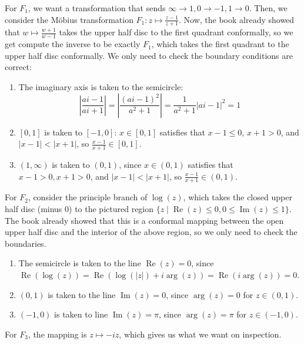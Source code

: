 \documentclass[12pt,letterpaper]{article}
\theoremstyle{definition}
\DeclareMathOperator{\real}{Re}
\DeclareMathOperator{\imag}{Im}
\begin{document}
For $F_{1}$, we want a transformation that sends $\infty \rightarrow 1, 0 \rightarrow -1, 1 \rightarrow 0$. Then, we consider the M\"obius transformation $F_{1}: z \mapsto \frac{z - 1}{z + 1}$. Now, the book already showed that $w \mapsto \frac{w + 1}{w - 1}$ takes the upper half disc to the first quadrant conformally, so we get compute the inverse to be exactly $F_{1}$, which takes the first quadrant to the upper half disc conformally. We only need to check the boundary conditions are correct:
\begin{enumerate}
  \item The imaginary axis is taken to the semicircle:
        \[
          \left|\frac{ai - 1}{ai + 1}\right| = \left|\frac{(ai - 1)^{2}}{a^{2} + 1}\right| = \frac{1}{a^{2} + 1}|ai - 1|^{2} = 1
        \]
  \item $[0, 1]$ is taken to $[-1, 0]$: $x \in [0, 1]$ satisfies that $x - 1 \leq 0$, $x + 1 > 0$, and $|x - 1| < |x + 1|$, so $\frac{x - 1}{x + 1} \in [0, 1]$.
  \item $(1, \infty)$ is taken to $(0, 1)$, since $x \in (0, 1)$ satisfies that $x - 1 > 0, x + 1 > 0$, and $|x - 1| < |x + 1|$, so $\frac{x - 1}{x + 1} \in (0, 1)$.
\end{enumerate}

For $F_{2}$, consider the principle branch of $\log(z)$, which takes the closed upper half disc (minus 0) to the pictured region $\{z \mid \real(z) \leq 0, 0 \leq \imag(z) \leq 1\}$. The book already showed that this is a conformal mapping between the open upper half disc and the interior of the above region, so we only need to check the boundaries.
\begin{enumerate}
  \item The semicircle is taken to the line $\real(z) = 0$, since $\real(\log(z)) = \real(\log(|z|) + i\arg(z)) = \real(i\arg(z)) = 0$.
  \item $(0, 1)$ is taken to the line $\imag(z) = 0$, since $\arg(z) = 0$ for $z \in (0, 1)$.
  \item $(-1, 0)$ is taken to line $\imag(z) = \pi$, since $\arg(z) = \pi$ for $z \in (-1, 0)$.
\end{enumerate}

For $F_{3}$, the mapping is $z \mapsto -iz$, which gives us what we want on inspection.
\end{document}
